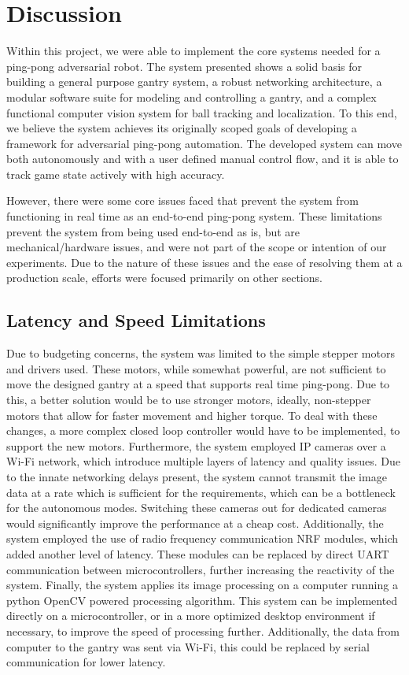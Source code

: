 \chapter{Discussion}
Within this project, we were able to implement the core systems needed for a ping-pong adversarial robot. The system presented shows a solid basis for building a general purpose gantry system, a robust networking architecture, a modular software suite for modeling and controlling a gantry, and a complex functional computer vision system for ball tracking and localization. To this end, we believe the system achieves its originally scoped goals of developing a framework for adversarial ping-pong automation. The developed system can move both autonomously and with a user defined manual control flow, and it is able to track game state actively with high accuracy.

 However, there were some core issues faced that prevent the system from functioning in real time as an end-to-end ping-pong system. These limitations prevent the system from being used end-to-end as is, but are mechanical/hardware issues, and were not part of the scope or intention of our experiments. Due to the nature of these issues and the ease of resolving them at a production scale, efforts were focused primarily on other sections.

\section{Latency and Speed Limitations}
Due to budgeting concerns, the system was limited to the simple stepper motors and drivers used. These motors, while somewhat powerful, are not sufficient to move the designed gantry at a speed that supports real time ping-pong. Due to this, a better solution would be to use stronger motors, ideally, non-stepper motors that allow for faster movement and higher torque. To deal with these changes, a more complex closed loop controller would have to be implemented, to support the new motors.
Furthermore, the system employed IP cameras over a Wi-Fi network, which introduce multiple layers of latency and quality issues. Due to the innate networking delays present, the system cannot transmit the image data at a rate which is sufficient for the requirements, which can be a bottleneck for the autonomous modes. Switching these cameras out for dedicated cameras would significantly improve the performance at a cheap cost.
Additionally, the system employed the use of radio frequency communication NRF modules, which added another level of latency. These modules can be replaced by direct UART communication between microcontrollers, further increasing the reactivity of the system.
Finally, the system applies its image processing on a computer running a python OpenCV powered processing algorithm. This system can be implemented directly on a microcontroller, or in a more optimized desktop environment if necessary, to improve the speed of processing further. Additionally, the data from computer to the gantry was sent via Wi-Fi, this could be replaced by serial communication for lower latency.

